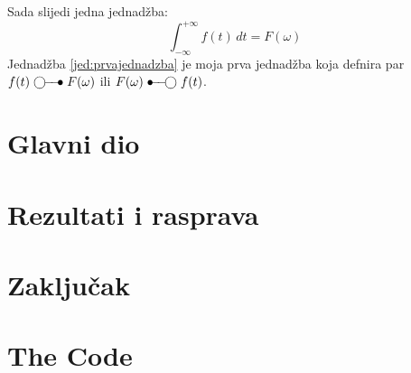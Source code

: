 \documentclass[seminarskirad]{fer}
\begin{document}
Sada slijedi jedna jednadžba:
\begin{equation}
  \label{jed:prvajednadzba}
  \int_{-\infty}^{+\infty}f(t)\,dt=F(\omega)
\end{equation}
Jednadžba \eqref{jed:prvajednadzba} je moja prva jednadžba koja defnira par $f(t)\ufrek F(\omega)$ ili $F(\omega)\uvrem f(t)$.


\chapter{Glavni dio}
\label{pog:glavni_dio}

\Blindtext


\chapter{Rezultati i rasprava}
\label{pog:rezultati_i_rasprava}

\Blindtext


\chapter{Zaključak}
\label{pog:zakljucak}

\blindtext







\backmatter

\chapter{The Code}

\Blindtext
\end{document}
